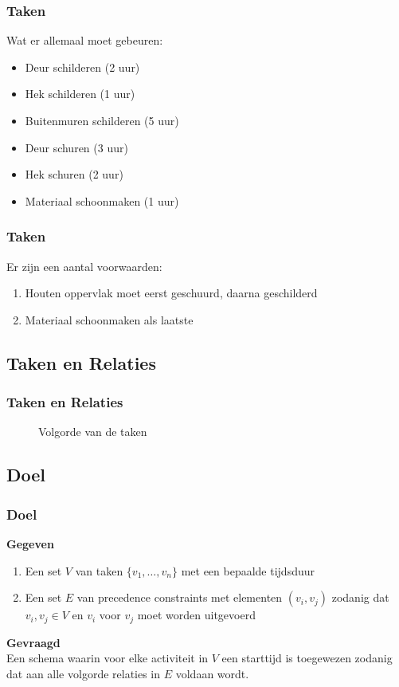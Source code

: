 \documentclass{beamer}
\theoremstyle{definition}
\newcommand{\inputtikz}[1]{}
\begin{document}
\begin{frame}
    \frametitle{Taken}
    Wat er allemaal moet gebeuren:
     \begin{itemize}
    	\item Deur schilderen (2 uur)
	\item Hek schilderen (1 uur)
	\item Buitenmuren schilderen (5 uur)
	\item Deur schuren (3 uur)
	\item Hek schuren (2 uur)
	\item Materiaal schoonmaken (1 uur)
    \end{itemize}
\end{frame}

\begin{frame}
    	\frametitle{Taken}
   	Er zijn een aantal voorwaarden:
	\begin{enumerate}
	    	\item Houten oppervlak moet eerst geschuurd, daarna geschilderd
		\item Materiaal schoonmaken als laatste
	\end{enumerate}
\end{frame}

\subsection{Taken en Relaties}
\begin{frame}
	\frametitle{Taken en Relaties}
	\vspace{-1em}
	\begin{figure}[ht]
		\makebox[\textwidth][c]{\resizebox{.8\paperwidth}{!}{
			\inputtikz{precendence_graph}
		}}
		\vspace{-1em}
		\caption{Volgorde van de taken}
	\end{figure}
\end{frame}

\subsection{Doel}
\begin{frame}
    	\frametitle{Doel}
   	\textbf{Gegeven}
	\begin{enumerate}
		\item Een set $V$ van taken $\{v_1,\dots,v_n\}$ met een bepaalde tijdsduur
		\item Een set $E$ van precedence constraints met elementen $(v_i, v_j)$ zodanig dat $v_i, v_j \in V$ en $v_i$ voor $v_j$ moet worden uitgevoerd
	\end{enumerate}
	
	\textbf{Gevraagd}\\
	Een schema waarin voor elke activiteit in $V$ een starttijd is toegewezen zodanig dat aan alle volgorde relaties in $E$ voldaan wordt.
\end{frame}
\end{document}
